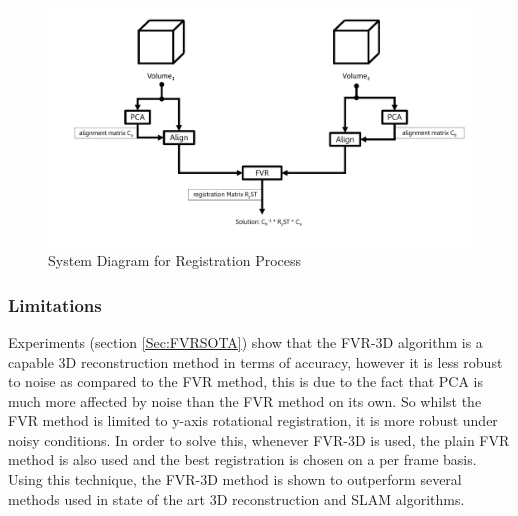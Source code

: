 \begin{figure}[!htb]
\centering
\includegraphics[width=6.0in]{images/methodology/FVR/pipeline8}
\caption{System Diagram for Registration Process}
\label{fig:PIPELINE8}
\end{figure}


\subsubsection{Limitations}

Experiments (section \ref{Sec:FVRSOTA}) show that the FVR-3D algorithm is a capable 3D reconstruction method in terms of accuracy, however it is less robust to noise as compared to the FVR method, this is due to the fact that PCA is much more affected by noise than the FVR method on its own. So whilst the FVR method is limited to y-axis rotational registration, it is more robust under noisy conditions. In order to solve this, whenever FVR-3D is used, the plain FVR method is also used and the best registration is chosen on a per frame basis. Using this technique, the FVR-3D method is shown to outperform several methods used in state of the art 3D reconstruction and SLAM algorithms. 




